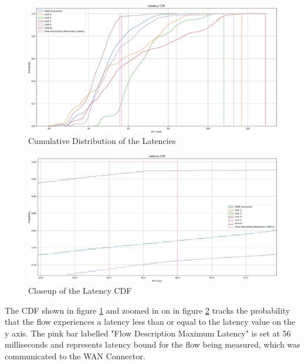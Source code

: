 \begin{figure}[h]
    \centering
        \includegraphics[height=0.8\textwidth,width=\textwidth]{fig/latency_cdf1.png}
        \caption{Cumulative Distribution of the Latencies}
        \label{fig:latency_cdf1}
\end{figure}

\begin{figure}[h]
    \centering
        \includegraphics[height=0.66\textwidth,width=\textwidth]{fig/latency_cdf1_super_zoomed_in.png}
        \caption{Closeup of the Latency CDF}
        \label{fig:latency_cdf1_super_zoomed_in}
\end{figure}

The CDF shown in figure \ref{fig:latency_cdf1} and zoomed in on in figure \ref{fig:latency_cdf1_super_zoomed_in} tracks the probability that the flow experiences a latency less than or equal to the latency value on the y axis. The pink bar labelled "Flow Description Maximum Latency" is set at 56 milliseconds and represents latency bound for the flow being measured, which was communicated to the WAN Connector.


